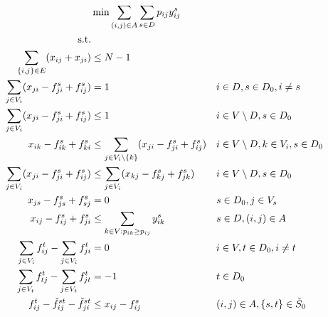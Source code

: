  	\begin{small} 	
\begin{subequations}
\begin{flalign}
\label{objective:mfinpf2} &\makebox[0pt][l]{$\displaystyle{}\min \sum\limits_{(i,j) \in A} \sum\limits_{s \in D} p_{ij} y^s_{ij} $}  & &&\\ \notag  
   \text{s.t.}&  &  &                 && \\	\
\label{con:mfinpf2:maxsize}   \sum\limits_{\{i,j\}\in E}(x_{ij}+x_{ji}) & \leq  N-1  &   && \\
     \label{con:mfinpf2:arrowFromDest}  \sum\limits_{j\in V_i}(x_{ji}-f^s_{ji}+f^s_{ij})          & = 1       			&& i\in D, s\in D_0, i \neq s && \\ 
		  \label{con:mfinpf2:arrowFromNonDestB}  \sum\limits_{j \in V_i}(x_{ji}-f^s_{ji}+f^s_{ij})  &\leq 1 && i\in V \setminus D, s\in D_0   &&\\		
		  \label{con:mfinpf2:arrowFromNonDestA}  x_{ik}-f^s_{ik}+f^s_{ki}  & \leq \sum\limits_{j \in V_i\setminus\{k\}}(x_{ji}-f^s_{ji}+f^s_{ij}) &&
		  i\in V \setminus D,k\in V_i, s\in D_0   &&\\		  
      \label{con:mfinpf2:extraCon}  \sum\limits_{j \in V_i}(x_{ji}-f^s_{ji}+f^s_{ij}) & \leq \sum\limits_{j \in V_i}(x_{kj}-f^s_{kj}+f^s_{jk}) &&  i\in V\setminus D, s\in D_0  &&\\			  \label{con:mfinpf2:startInSource}  x_{js} - f^s_{js}+f^s_{sj}    & = 0       			&&  s\in D_0, j\in V_s &&\\		 
		  \label{con:mfinpf2:yvar}  x_{ij}-f^s_{ij}+f^s_{ji} & \leq \sum\limits_{k\in V:p_{ik}\geq p_{ij}}y^s_{ik} && s\in D, (i,j)\in A 		&&\\  
		 		 \label{con:mfinpf2:flowNormal}  \sum\limits_{\substack{ j\in V_i }}f^t_{ij}-\sum\limits_{\substack{j\in V_i }}f^t_{ji}    & = 0     			&& i\in V, t\in D_0, i \neq t &&\\	
		 	 \label{con:mfinpf2:flowDest}  \sum\limits_{\substack{j\in V_t}}f^t_{tj}-\sum\limits_{\substack{j\in V_t}}f^t_{jt}    & = -1     			&&  t \in D_0 &&\\	
           \label{con:mfinpf2:fcap}   f^t_{ij} - \check{f}^{st}_{ij} - \check{f}^{st}_{ji} &\leq  x_{ij}-f^s_{ij}   && (i,j)\in A, \{s,t\}\in \check{S}_0 && &\\ 		 			 	 

\end{flalign}
\end{subequations}
\end{small}
